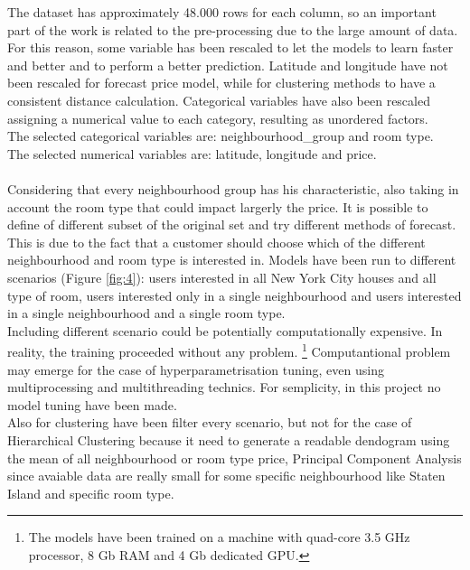 \documentclass{FR16}
\begin{document}
The dataset has approximately 48.000 rows for each column, so an important part of the work is related to the pre-processing due to the large amount of data. For this reason, some variable has been rescaled to let the models to learn faster and better and to perform a better prediction. Latitude and longitude have not been rescaled for forecast price model, while for clustering methods to have a consistent distance calculation. Categorical variables have also been rescaled assigning a numerical value to each category, resulting as unordered factors.\\
The selected categorical variables are: neighbourhood\_group and room type.\\
The selected numerical variables are: latitude, longitude and price.
\\\\
Considering that every neighbourhood group has his characteristic, also taking in account the room type that could impact largerly the price. It is possible to define of different subset of the original set and try different methods of forecast. This is due to the fact that a customer should choose which of the different neighbourhood and room type is interested in. Models have been run to different scenarios (Figure \ref{fig:4}): users interested in all New York City houses and all type of room, users interested only in a single neighbourhood and users interested in a single neighbourhood and a single room type. 
\\ Including different scenario could be potentially computationally expensive. In reality, the training proceeded without any problem. \footnote{ The models have been trained on a machine with quad-core 3.5 GHz processor, 8 Gb RAM and 4 Gb dedicated GPU.} Computantional problem may emerge for the case of hyperparametrisation tuning, even using multiprocessing and multithreading technics. For semplicity, in this project no model tuning have been made. \\
Also for clustering have been filter every scenario, but not for the case of Hierarchical Clustering because it need to generate a readable dendogram using the mean of all neighbourhood or room type price, Principal Component Analysis since avaiable data are really small for some specific neighbourhood like Staten Island and specific room type.
\end{document}
